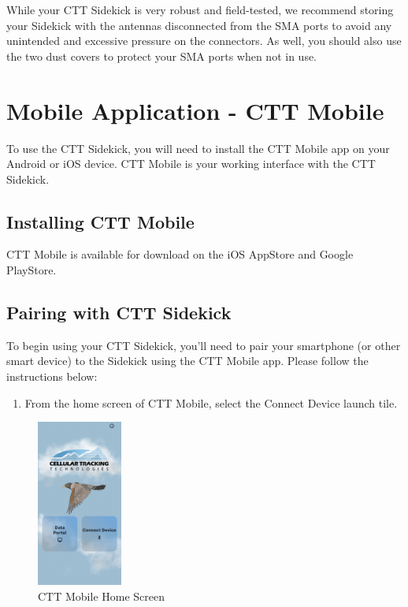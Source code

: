 \documentclass[
]{article}
\providecommand{\tightlist}{%
  \setlength{\itemsep}{0pt}\setlength{\parskip}{0pt}}
\begin{document}
While your CTT Sidekick is very robust and field-tested, we recommend
storing your Sidekick with the antennas disconnected from the SMA ports
to avoid any unintended and excessive pressure on the connectors. As
well, you should also use the two dust covers to protect your SMA ports
when not in use.

\hypertarget{mobile-application---ctt-mobile}{%
\section{Mobile Application - CTT
Mobile}\label{mobile-application---ctt-mobile}}

To use the CTT Sidekick, you will need to install the CTT Mobile app on
your Android or iOS device. CTT Mobile is your working interface with
the CTT Sidekick.

\hypertarget{installing-ctt-mobile}{%
\subsection{Installing CTT Mobile}\label{installing-ctt-mobile}}

CTT Mobile is available for download on the iOS AppStore and Google
PlayStore.

\hypertarget{pairing-with-ctt-sidekick}{%
\subsection{Pairing with CTT Sidekick}\label{pairing-with-ctt-sidekick}}

To begin using your CTT Sidekick, you'll need to pair your smartphone
(or other smart device) to the Sidekick using the CTT Mobile app. Please
follow the instructions below:

\begin{enumerate}
\def\labelenumi{\arabic{enumi}.}
\tightlist
\item
  From the home screen of CTT Mobile, select the Connect Device launch
  tile.
\end{enumerate}

\begin{figure}
\hypertarget{id}{%
\centering
\includegraphics[width=0.25\textwidth,height=\textheight]{./images/CTT Mobile_1.jpg}
\caption{CTT Mobile Home Screen}\label{id}
}
\end{figure}
\end{document}
